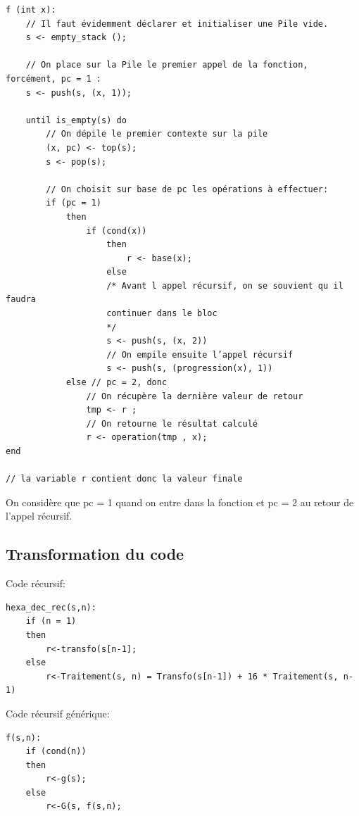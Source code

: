 \documentclass[a4paper, 11pt, oneside]{article}
\begin{document}
\begin{lstlisting}
f (int x):
    // Il faut évidemment déclarer et initialiser une Pile vide.
    s <- empty_stack ();

    // On place sur la Pile le premier appel de la fonction, forcément, pc = 1 :
    s <- push(s, (x, 1));

    until is_empty(s) do
        // On dépile le premier contexte sur la pile
        (x, pc) <- top(s);
        s <- pop(s);

        // On choisit sur base de pc les opérations à effectuer:
        if (pc = 1)
            then
                if (cond(x))
                    then
                        r <- base(x);
                    else
                    /* Avant l appel récursif, on se souvient qu il faudra
                    continuer dans le bloc
                    */
                    s <- push(s, (x, 2))
                    // On empile ensuite l’appel récursif
                    s <- push(s, (progression(x), 1))
            else // pc = 2, donc
                // On récupère la dernière valeur de retour
                tmp <- r ;
                // On retourne le résultat calculé
                r <- operation(tmp , x);
end

// la variable r contient donc la valeur finale
\end{lstlisting}

On considère que pc = 1 quand on entre dans la fonction et pc = 2 au retour de
l’appel récursif.


\subsection{Transformation du code}

\begin{center}
    Code récursif:
\end{center}
\begin{lstlisting}
hexa_dec_rec(s,n):
    if (n = 1)
    then
        r<-transfo(s[n-1];
    else
        r<-Traitement(s, n) = Transfo(s[n-1]) + 16 * Traitement(s, n-1)
\end{lstlisting}

\begin{center}
    Code récursif générique:
\end{center}
\begin{lstlisting}
f(s,n):
    if (cond(n))
    then
        r<-g(s);
    else
        r<-G(s, f(s,n);
\end{lstlisting}
\end{document}
